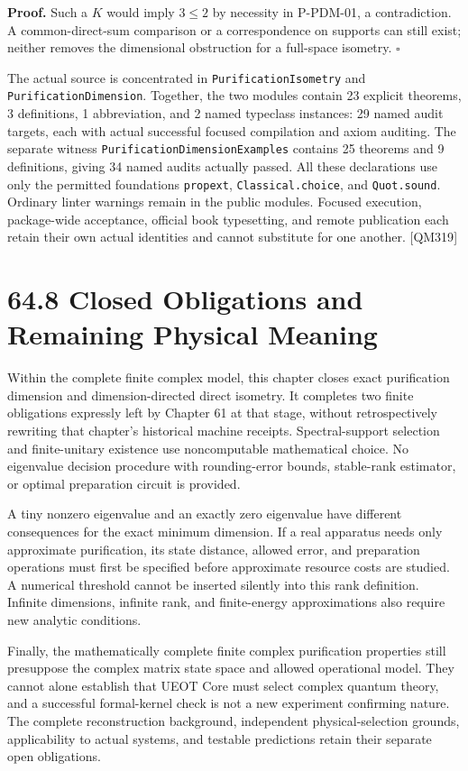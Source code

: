 \documentclass[
  11pt,
  oneside]{book}
\begin{document}
\textbf{Proof.} Such a \(K\) would imply \(3\le2\) by necessity in
P-PDM-01, a contradiction. A common-direct-sum comparison or a
correspondence on supports can still exist; neither removes the
dimensional obstruction for a full-space isometry. \(\square\)

The actual source is concentrated in \texttt{Purification\allowbreak Isometry} and
\texttt{Purification\allowbreak Dimension}. Together, the two modules contain 23
explicit theorems, 3 definitions, 1 abbreviation, and 2 named typeclass
instances: 29 named audit targets, each with actual successful focused
compilation and axiom auditing. The separate witness
\texttt{Purification\allowbreak Dimension\allowbreak Examples} contains 25 theorems and 9
definitions, giving 34 named audits actually passed. All these
declarations use only the permitted foundations \texttt{propext},
\texttt{Classical.\allowbreak choice}, and \texttt{Quot.\allowbreak sound}. Ordinary linter
warnings remain in the public modules. Focused execution, package-wide
acceptance, official book typesetting, and remote publication each
retain their own actual identities and cannot substitute for one
another. {[}QM319{]}

\section{64.8 Closed Obligations and Remaining Physical Meaning}

Within the complete finite complex model, this chapter closes exact
purification dimension and dimension-directed direct isometry. It
completes two finite obligations expressly left by Chapter 61 at that
stage, without retrospectively rewriting that chapter's historical
machine receipts. Spectral-support selection and finite-unitary
existence use noncomputable mathematical choice. No eigenvalue decision
procedure with rounding-error bounds, stable-rank estimator, or optimal
preparation circuit is provided.

A tiny nonzero eigenvalue and an exactly zero eigenvalue have different
consequences for the exact minimum dimension. If a real apparatus needs
only approximate purification, its state distance, allowed error, and
preparation operations must first be specified before approximate
resource costs are studied. A numerical threshold cannot be inserted
silently into this rank definition. Infinite dimensions, infinite rank,
and finite-energy approximations also require new analytic conditions.

Finally, the mathematically complete finite complex purification
properties still presuppose the complex matrix state space and allowed
operational model. They cannot alone establish that UEOT Core must
select complex quantum theory, and a successful formal-kernel check is
not a new experiment confirming nature. The complete reconstruction
background, independent physical-selection grounds, applicability to
actual systems, and testable predictions retain their separate open
obligations.
\end{document}
